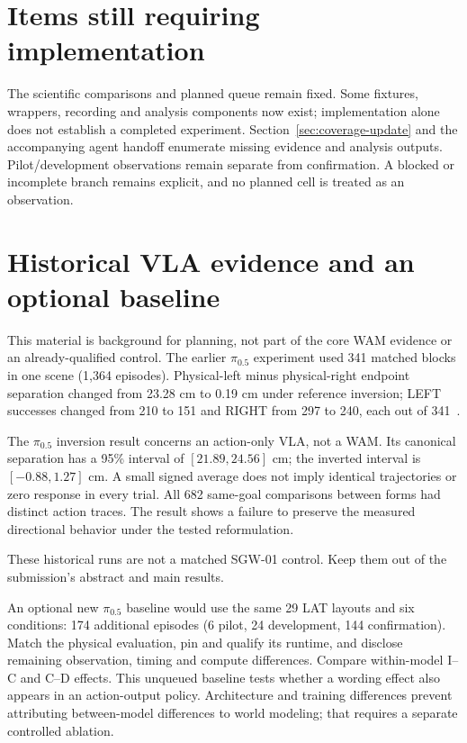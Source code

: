 \documentclass[11pt]{article}
\begin{document}
\section{Items still requiring implementation}
The scientific comparisons and planned queue remain fixed. Some fixtures, wrappers, recording and analysis components now exist; implementation alone does not establish a completed experiment. Section~\ref{sec:coverage-update} and the accompanying agent handoff enumerate missing evidence and analysis outputs. Pilot/development observations remain separate from confirmation. A blocked or incomplete branch remains explicit, and no planned cell is treated as an observation.

\section{Historical VLA evidence and an optional baseline}\label{app:pi05}
This material is background for planning, not part of the core WAM evidence or an already-qualified control. The earlier $\pi_{0.5}$ experiment used 341 matched blocks in one scene (1,364 episodes). Physical-left minus physical-right endpoint separation changed from 23.28 cm to 0.19 cm under reference inversion; LEFT successes changed from 210 to 151 and RIGHT from 297 to 240, each out of 341~\cite{archive,oldpaper}.

The $\pi_{0.5}$ inversion result concerns an action-only VLA, not a WAM. Its canonical separation has a 95\% interval of $[21.89,24.56]$ cm; the inverted interval is $[-0.88,1.27]$ cm. A small signed average does not imply identical trajectories or zero response in every trial. All 682 same-goal comparisons between forms had distinct action traces. The result shows a failure to preserve the measured directional behavior under the tested reformulation.

These historical runs are not a matched SGW-01 control. Keep them out of the submission's abstract and main results.

An optional new $\pi_{0.5}$ baseline would use the same 29 LAT layouts and six conditions: 174 additional episodes (6 pilot, 24 development, 144 confirmation). Match the physical evaluation, pin and qualify its runtime, and disclose remaining observation, timing and compute differences. Compare within-model I--C and C--D effects. This unqueued baseline tests whether a wording effect also appears in an action-output policy. Architecture and training differences prevent attributing between-model differences to world modeling; that requires a separate controlled ablation.
\end{document}

